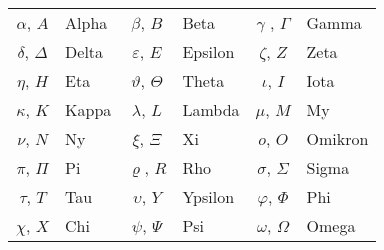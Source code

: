 
\begin{small}
\begin{tabular}{clclcl}
$\alpha$, $A$ & Alpha & $\beta$, $B$ & Beta & $\gamma$ , $\Gamma$ & Gamma \\
$\delta$, $\Delta$ & Delta & $\varepsilon$, $E$ & Epsilon & $\zeta$, $Z$ & Zeta\\
$\eta$, $H$ & Eta & $\vartheta$, $\Theta$ & Theta & $\iota$, $I$ & Iota \\
$\kappa$, $K$ & Kappa & $\lambda$, $L$ & Lambda & $\mu$, $M$ & My\\
$\nu$, $N$ & Ny & $\xi$, $\Xi$ & Xi & $o$, $O$ & Omikron \\
$\pi$, $\Pi$ & Pi & $\varrho$, $R$ & Rho & $\sigma$, $\Sigma$ & Sigma\\
$\tau$, $T$ & Tau & $\upsilon$, $Y$ & Ypsilon & $\varphi$, $\Phi$ & Phi\\
$\chi$, $X$ & Chi & $\psi$, $\Psi$ & Psi & $\omega$, $\Omega$ & Omega
\end{tabular}
\end{small}